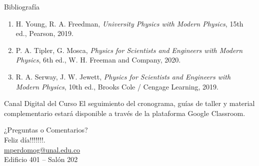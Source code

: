 \documentclass[aspectratio=169,xcolor=dvipsnames]{beamer}
\begin{document}
\begin{frame}{Bibliografía}
\begin{enumerate}
\item H. Young, R. A. Freedman, \emph{University Physics with Modern Physics}, 15th ed., Pearson, 2019.
\item P. A. Tipler, G. Mosca, \emph{Physics for Scientists and Engineers with Modern Physics}, 6th ed., W. H. Freeman and Company, 2020.
\item R. A. Serway, J. W. Jewett, \emph{Physics for Scientists and Engineers with Modern Physics}, 10th ed., Brooks Cole / Cengage Learning, 2019.
\end{enumerate}
\begin{block}{Canal Digital del Curso}
El seguimiento del cronograma, guías de taller y material complementario estará disponible a través de la plataforma Google Classroom.
\end{block}
\end{frame}

\begin{frame}
\begin{center}
{\Large ¿Preguntas o Comentarios?}\\[0.6cm]
Feliz día!!!!!!!.\\[0.3cm]
\href{mailto:mperdomog@unal.edu.co}{mperdomog@unal.edu.co}\\
Edificio 401 -- Salón 202
\end{center}
\end{frame}
\end{document}
